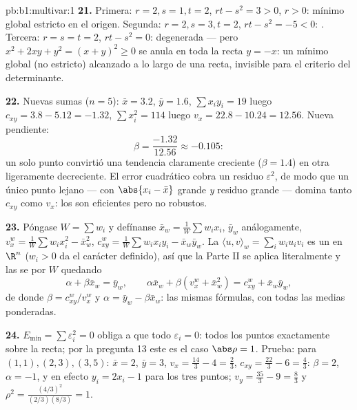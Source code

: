 \begin{solution}{pb:b1:multivar:1}
\textbf{21.} Primera: $r = 2, s = 1, t = 2$, $rt - s^2 = 3 > 0$,
$r > 0$: mínimo global estricto en el origen. Segunda: $r = 2, s
= 3, t = 2$, $rt - s^2 = -5 < 0$: . Tercera: $r = s = t =
2$, $rt - s^2 = 0$: degenerada --- pero $x^2 + 2xy + y^2 = (x +
y)^2 \geq 0$ se anula en toda la recta $y = -x$: un
mínimo global (no estricto) alcanzado a lo largo de una recta, invisible para
el criterio del determinante.

\textbf{22.} Nuevas sumas ($n = 5$): $\bar x = 3.2$, $\bar y =
1.6$, $\sum x_iy_i = 19$ luego $c_{xy} = 3.8 - 5.12 = -1.32$,
$\sum x_i^2 = 114$ luego $v_x = 22.8 - 10.24 = 12.56$. Nueva pendiente:
\[
\beta = \frac{-1.32}{12.56} \approx -0.105 :
\]
un solo punto convirtió una tendencia claramente creciente ($\beta = 1.4$) en
otra ligeramente decreciente. El error cuadrático cobra un residuo
$\varepsilon^2$, de modo que un único punto lejano --- con
$\abs{x_{i} - \bar x}$ grande \emph{y} residuo grande --- domina
tanto $c_{xy}$ como $v_x$: los  son eficientes pero no
robustos.

\textbf{23.} Póngase $W = \sum w_i$ y defínanse $\bar x_w =
\frac1W\sum w_ix_i$, $\bar y_w$ análogamente, $v_x^w = \frac1W\sum
w_ix_i^2 - \bar x_w^2$, $c^w_{xy} = \frac1W\sum w_ix_iy_i - \bar
x_w\bar y_w$. La  $\langle u, v\rangle_w = \sum_i w_iu_iv_i$
es un  en $\R^n$ ($w_i > 0$ da el carácter definido), así que
la Parte II se aplica literalmente y las  se  por $W$
quedando
\[
\alpha + \beta\bar x_w = \bar y_w,
\qquad
\alpha\bar x_w + \beta(v^w_x + \bar x_w^2) = c^w_{xy} + \bar
x_w\bar y_w ,
\]
de donde $\beta = c^w_{xy}/v^w_x$ y $\alpha = \bar y_w -
\beta\bar x_w$: las mismas fórmulas, con todas las medias ponderadas.

\textbf{24.} $E_{\min} = \sum\varepsilon_i^2 = 0$ obliga a que todo
$\varepsilon_i = 0$: todos los puntos exactamente sobre la recta; por la pregunta
13 este es el caso $\abs\rho = 1$. Prueba: para $(1,1), (2,3),
(3,5)$: $\bar x = 2$, $\bar y = 3$, $v_x = \frac{14}3 - 4 =
\frac23$, $c_{xy} = \frac{22}3 - 6 = \frac43$: $\beta = 2$,
$\alpha = -1$, y en efecto $y_i = 2x_i - 1$ para los tres puntos;
$v_y = \frac{35}3 - 9 = \frac83$ y $\rho^2 =
\frac{(4/3)^2}{(2/3)(8/3)} = 1$.


\end{solution}
